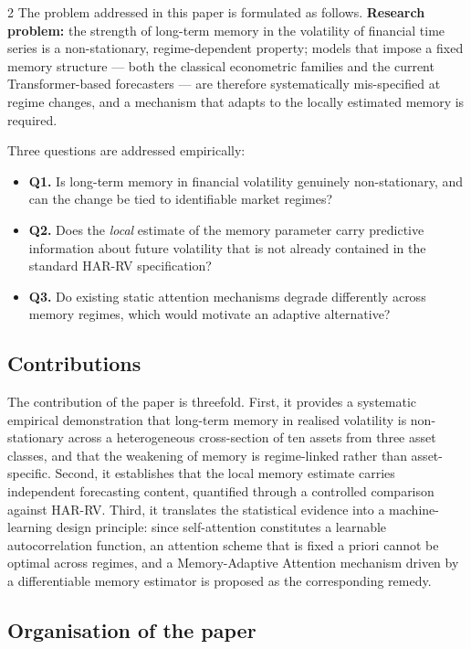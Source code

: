 \documentclass[a4paper,10pt,twoside]{article}
\begin{document}
\begin{multicols}{2}
The problem addressed in this paper is formulated as follows. \textbf{Research problem:} the
strength of long-term memory in the volatility of financial time series is a non-stationary,
regime-dependent property; models that impose a fixed memory structure --- both the classical
econometric families and the current Transformer-based forecasters --- are therefore systematically
mis-specified at regime changes, and a mechanism that adapts to the locally estimated memory is
required.

Three questions are addressed empirically:

\begin{itemize}
\item \textbf{Q1.} Is long-term memory in financial volatility genuinely non-stationary, and can
the change be tied to identifiable market regimes?
\item \textbf{Q2.} Does the \emph{local} estimate of the memory parameter carry predictive
information about future volatility that is not already contained in the standard HAR-RV
specification?
\item \textbf{Q3.} Do existing static attention mechanisms degrade differently across memory
regimes, which would motivate an adaptive alternative?
\end{itemize}

\subsection{Contributions}

The contribution of the paper is threefold. First, it provides a systematic empirical
demonstration that long-term memory in realised volatility is non-stationary across a
heterogeneous cross-section of ten assets from three asset classes, and that the weakening of
memory is regime-linked rather than asset-specific. Second, it establishes that the local memory
estimate carries independent forecasting content, quantified through a controlled comparison
against HAR-RV. Third, it translates the statistical evidence into a machine-learning design
principle: since self-attention constitutes a learnable autocorrelation function, an attention
scheme that is fixed a priori cannot be optimal across regimes, and a Memory-Adaptive Attention
mechanism driven by a differentiable memory estimator is proposed as the corresponding remedy.

\subsection{Organisation of the paper}


\end{multicols}
\end{document}
